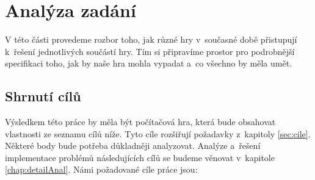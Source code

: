 
\chapter{Analýza zadání}
\label{chap:analyza}

V této části provedeme rozbor toho, jak různé hry v~současné době přistupují k~řešení jednotlivých součástí hry. Tím si připravíme prostor pro podrobnější specifikaci toho, jak by naše hra mohla vypadat a~co všechno by měla umět.








\section{Shrnutí cílů}

Výsledkem této práce by měla být počítačová hra, která bude obsahovat vlastnosti ze seznamu cílů níže. Tyto cíle rozšiřují požadavky z~kapitoly \ref{sec:cile}. Některé body bude potřeba důkladněji analyzovat. Analýze a~řešení implementace problémů následujících cílů se budeme věnovat v~kapitole \ref{chap:detailAnal}. Námi požadované cíle práce jsou:

